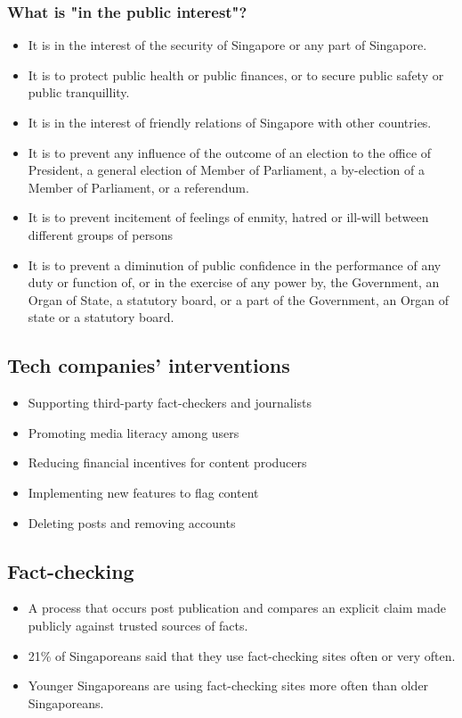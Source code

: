 \documentclass[11pt]{article}
\begin{document}
\subsubsection{What is "in the public interest"?}
\label{sec:orgef94996}
\begin{itemize}
\item It is in the interest of the security of Singapore or any part of Singapore.
\item It is to protect public health or public finances, or to secure public safety or public tranquillity.
\item It is in the interest of friendly relations of Singapore with other countries.
\item It is to prevent any influence of the outcome of an election to the office of President, a general election of Member of Parliament, a by-election of a Member of Parliament, or a referendum.
\item It is to prevent incitement of feelings of enmity, hatred or ill-will between different groups of persons
\item It is to prevent a diminution of public confidence in the performance of any duty or function of, or in the exercise of any power by, the Government, an Organ of State, a statutory board, or a part of the Government, an Organ of state or a statutory board.
\end{itemize}
\subsection{Tech companies' interventions}
\label{sec:org2eb7c7d}
\begin{itemize}
\item Supporting third-party fact-checkers and journalists
\item Promoting media literacy among users
\item Reducing financial incentives for content producers
\item Implementing new features to flag content
\item Deleting posts and removing accounts
\end{itemize}
\subsection{Fact-checking}
\label{sec:org68f566e}
\begin{itemize}
\item A process that occurs post publication and compares an explicit claim made publicly against trusted sources of facts.
\item 21\% of Singaporeans said that they use fact-checking sites often or very often.
\item Younger Singaporeans are using fact-checking sites more often than older Singaporeans.
\end{itemize}
\end{document}
